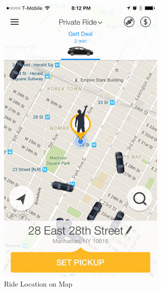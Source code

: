 \documentclass[a4paper, 12pt]{article} %
\begin{document}
                \begin{figure}[htp]
                    \centering
                    \begin{subfigure}{0.4\textwidth}
                        \includegraphics[width=0.8\linewidth, height=0.9\textheight, keepaspectratio]{Images/Gett_Map.jpeg}
                        \caption{Ride Location on Map}
                        \label{gett_map}
                    \end{subfigure}
                    \begin{subfigure}{0.4\textwidth}

\end{subfigure}
\end{figure}
\end{document}

